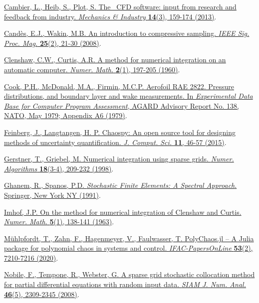 \documentclass{eurosae}
\begin{document}
\begin{thebibliography}{99}

\href{\webDOI/10.1051/meca/2013056}{Cambier, L., Heib, S., Plot, S. The \elsA\ CFD software: input from research and feedback from industry. {\sl Mechanics \& Industry} {\bf 14}(3), 159-174 (2013)}.

\href{\webDOI/10.1109/MSP.2007.914731}{Cand\`es, E.J., Wakin, M.B. An introduction to compressive sampling. {\sl IEEE Sig. Proc. Mag.} {\bf 25}(2), 21-30 (2008)}.

\href{\webDOI/10.1007/BF01386223}{Clenshaw, C.W., Curtis, A.R. A method for numerical integration on an automatic computer. {\sl Numer. Math.} {\bf 2}(1), 197-205 (1960)}.

\href{http://ftp.rta.nato.int/public/PubFullText/AGARD/AR/AGARD-AR-138/AGARD-AR-138.pdf}{Cook, P.H., McDonald, M.A., Firmin, M.C.P. Aerofoil RAE 2822. Pressure distributions,
 and boundary layer and wake measurements. In {\sl Experimental Data Base for Computer Program Assessment}, AGARD Advisory Report No. 138, NATO, May 1979; Appendix A6 (1979)}.
 
\href{\webDOI/10.1016/j.jocs.2015.08.008}{Feinberg, J., Langtangen, H. P. Chaospy: An open source tool for designing methods of uncertainty quantification. {\sl J. Comput. Sci.} {\bf 11}, 46-57 (2015)}.

\href{\webDOI/10.1023/A:1019129717644}{Gerstner, T., Griebel, M. Numerical integration using sparse grids. {\sl Numer. Algorithms} {\bf 18}(3-4), 209-232 (1998)}.

\href{\webDOI/10.1007/978-1-4612-3094-6}{Ghanem, R., Spanos, P.D. {\sl Stochastic Finite Elements: A Spectral Approach}. Springer, New York NY (1991)}.

\href{\webDOI/10.1007/BF01385885}{Imhof, J.P. On the method for numerical integration of Clenshaw and Curtis. {\sl Numer. Math.} {\bf 5}(1), 138-141 (1963)}.

\href{\webDOI/10.1016/j.ifacol.2020.12.552}{M\" uhlpfordt, T., Zahn, F., Hagenmeyer, V., Faulwasser, T. PolyChaos.jl -- A Julia package for polynomial chaos in systems and control. {\sl IFAC-PapersOnLine} {\bf 53}(2), 7210-7216 (2020)}.

\href{\webDOI/10.1137/060663660}{Nobile, F., Tempone, R., Webster, G. A sparse grid stochastic collocation method for partial differential equations with random input data. {\sl SIAM J. Num. Anal.} {\bf 46}(5), 2309-2345 (2008)}.


\end{thebibliography}
\end{document}
